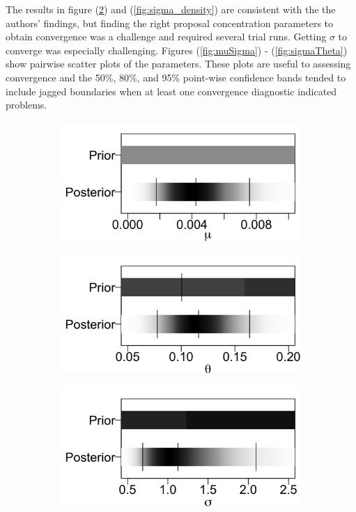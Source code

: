 \documentclass{uwstat572}
\begin{document}
The results in figure (\ref{fig:theta_density}) and (\ref{fig:sigma_density}) are consistent with the the authors' findings, but finding the right proposal concentration parameters to obtain convergence was a challenge and required several trial runs. 
Getting $\sigma$ to converge was especially challenging. 
Figures (\ref{fig:muSigma}) - (\ref{fig:sigmaTheta}) show pairwise scatter plots of the parameters. 
These plots are useful to assessing convergence and the 50\%, 80\%, and 95\% point-wise confidence bands  tended to include jagged boundaries when at least one convergence diagnostic indicated problems. 

\begin{figure}[H]
	\centering
	\begin{subfigure}[b]{0.3\textwidth}
		\includegraphics[width=\textwidth]{figures/figure_2a.png}
		\caption{}
		\label{fig:mu_density}
	\end{subfigure}
	\hfill
	\begin{subfigure}[b]{0.3\textwidth}
		\includegraphics[width=\textwidth]{figures/figure_2b.png}
		\caption{}
		\label{fig:theta_density}
	\end{subfigure}
	\hfill
	\begin{subfigure}[b]{0.3\textwidth}
		\includegraphics[width=\textwidth]{figures/figure_2c.png}

\end{subfigure}
\end{figure}
\end{document}
